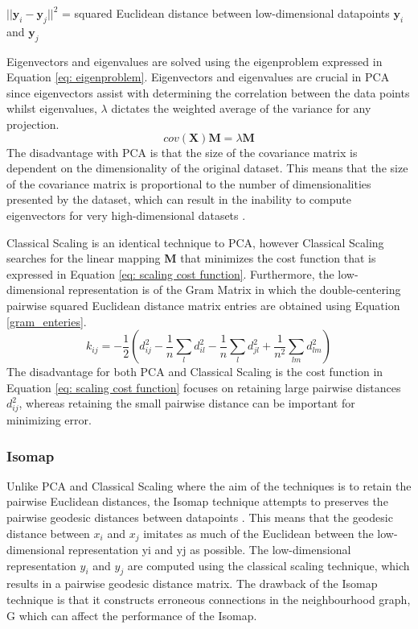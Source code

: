 \documentclass[11pt,twocolumn]{witseiepaper}
\begin{document}
	$||\textbf{y}_i - \textbf{y}_j ||^{2}$ = squared Euclidean distance between low-dimensional datapoints $\textbf{y}_i$ and $\textbf{y}_j$
	
	Eigenvectors and eigenvalues are solved using the eigenproblem expressed in Equation \ref{eq: eigenproblem}. Eigenvectors and eigenvalues are crucial in PCA since eigenvectors assist with determining the correlation between the data points whilst eigenvalues, $\lambda$ dictates the weighted average of the variance for any projection.
	\begin{equation}
	cov(\textbf{X})\textbf{M} = \lambda\textbf{M}
	\label{eq: eigenproblem}
	\end{equation}
	The disadvantage with PCA is that the size of the covariance matrix is dependent on the dimensionality of the original dataset. This means that the size of the covariance matrix is proportional to the number of dimensionalities presented by the dataset, which can result in the inability to compute eigenvectors for very high-dimensional datasets \cite{van2009dimensionality}.
	
	Classical Scaling is an identical technique to PCA, however Classical Scaling searches for the linear mapping \textbf{M} that minimizes the cost function that is expressed in Equation \ref{eq: scaling cost function}. Furthermore, the low-dimensional representation is of the Gram Matrix in which the double-centering pairwise squared Euclidean distance matrix entries are obtained using Equation \ref{gram_enteries}.
	\begin{equation}
	k_{ij} = -\frac{1}{2}(d_{ij}^{2}-\frac{1}{n}\sum_{l}d_{il}^{2} - \frac{1}{n}\sum_{l}d_{jl}^{2} + \frac{1}{n^2}\sum_{lm}d_{lm}^{2})
	\label{gram_enteries}
	\end{equation}
	The disadvantage for both PCA and Classical Scaling is the cost function in Equation \ref{eq: scaling cost function} focuses on retaining large pairwise distances $d_{ij}^2$, whereas retaining the small pairwise distance can be important for minimizing error.
	
	\subsubsection{Isomap}
	Unlike PCA and Classical Scaling where the aim of the techniques is to retain the pairwise Euclidean distances, the Isomap technique attempts to preserves the pairwise
	geodesic distances between datapoints \cite{Zhang2012}. This means that the geodesic distance between $x_i$ and $x_j$ imitates as much of the Euclidean between the low-dimensional representation yi and yj as possible. The low-dimensional representation $y_i$ and $y_j$ are computed using the classical scaling technique, which results in a pairwise geodesic distance matrix. The drawback of the Isomap technique is that it constructs erroneous connections in the neighbourhood graph, G which can affect the performance of the Isomap.
	
\end{document}
